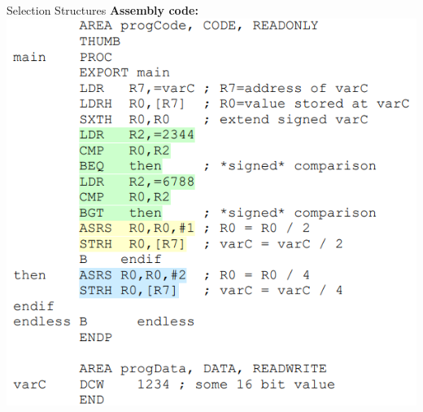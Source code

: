 \begin{example2}{Selection Structures}
\textbf{Assembly code:}\\
\includegraphics[width=\linewidth]{images/assemblycodeex3.png}
\end{example2}



